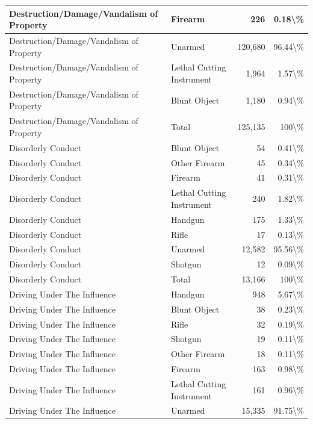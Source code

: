 \documentclass[
]{krantz}
\begin{document}
\begin{longtable}[t]{l|l|r|r}
\hline
Destruction/Damage/Vandalism of Property & Firearm & 226 & 0.18\textbackslash{}\%\\
\hline
Destruction/Damage/Vandalism of Property & Unarmed & 120,680 & 96.44\textbackslash{}\%\\
\hline
Destruction/Damage/Vandalism of Property & Lethal Cutting Instrument & 1,964 & 1.57\textbackslash{}\%\\
\hline
Destruction/Damage/Vandalism of Property & Blunt Object & 1,180 & 0.94\textbackslash{}\%\\
\hline
Destruction/Damage/Vandalism of Property & Total & 125,135 & 100\textbackslash{}\%\\
\hline
Disorderly Conduct & Blunt Object & 54 & 0.41\textbackslash{}\%\\
\hline
Disorderly Conduct & Other Firearm & 45 & 0.34\textbackslash{}\%\\
\hline
Disorderly Conduct & Firearm & 41 & 0.31\textbackslash{}\%\\
\hline
Disorderly Conduct & Lethal Cutting Instrument & 240 & 1.82\textbackslash{}\%\\
\hline
Disorderly Conduct & Handgun & 175 & 1.33\textbackslash{}\%\\
\hline
Disorderly Conduct & Rifle & 17 & 0.13\textbackslash{}\%\\
\hline
Disorderly Conduct & Unarmed & 12,582 & 95.56\textbackslash{}\%\\
\hline
Disorderly Conduct & Shotgun & 12 & 0.09\textbackslash{}\%\\
\hline
Disorderly Conduct & Total & 13,166 & 100\textbackslash{}\%\\
\hline
Driving Under The Influence & Handgun & 948 & 5.67\textbackslash{}\%\\
\hline
Driving Under The Influence & Blunt Object & 38 & 0.23\textbackslash{}\%\\
\hline
Driving Under The Influence & Rifle & 32 & 0.19\textbackslash{}\%\\
\hline
Driving Under The Influence & Shotgun & 19 & 0.11\textbackslash{}\%\\
\hline
Driving Under The Influence & Other Firearm & 18 & 0.11\textbackslash{}\%\\
\hline
Driving Under The Influence & Firearm & 163 & 0.98\textbackslash{}\%\\
\hline
Driving Under The Influence & Lethal Cutting Instrument & 161 & 0.96\textbackslash{}\%\\
\hline
Driving Under The Influence & Unarmed & 15,335 & 91.75\textbackslash{}\%\\

\end{longtable}
\end{document}

